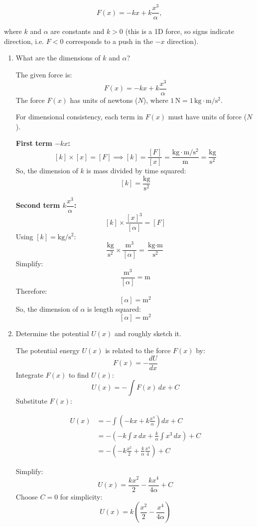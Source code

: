 \documentclass[12pt]{article}
\begin{document}
\[
F(x) = -kx + k \frac{x^3}{\alpha} ,
\]

where \(k\) and \(\alpha\) are constants and \(k > 0\) (this is a 1D force, so signs indicate direction, i.e. \(F < 0\) corresponds to a push in the \(-x\) direction).

\begin{enumerate}

\item What are the dimensions of \(k\) and \(\alpha\)?

The given force is:
\[
F(x) = -kx + k \frac{x^3}{\alpha}
\]
The force \(F(x)\) has units of newtons (\(N\)), where \(1\,\text{N} = 1\,\text{kg} \cdot \text{m}/\text{s}^2\).

For dimensional consistency, each term in \(F(x)\) must have units of force (\(N\)).

\textbf{First term \(-kx\):}
\[
[k] \times [x] = [F] \implies [k] = \frac{[F]}{[x]} = \frac{\text{kg} \cdot \text{m}/\text{s}^2}{\text{m}} = \frac{\text{kg}}{\text{s}^2}
\]
So, the dimension of \(k\) is mass divided by time squared:
\[
[k] = \frac{\text{kg}}{\text{s}^2}
\]

\textbf{Second term \(k \dfrac{x^3}{\alpha}\):}
\[
[k] \times \frac{[x]^3}{[\alpha]} = [F]
\]
Using \([k] = \text{kg}/\text{s}^2\):
\[
\frac{\text{kg}}{\text{s}^2} \times \frac{\text{m}^3}{[\alpha]} = \frac{\text{kg} \cdot \text{m}}{\text{s}^2}
\]
Simplify:
\[
\frac{\text{m}^3}{[\alpha]} = \text{m}
\]
Therefore:
\[
[\alpha] = \text{m}^2
\]
So, the dimension of \(\alpha\) is length squared:
\[
[\alpha] = \text{m}^2
\]

\item Determine the potential \(U(x)\) and roughly sketch it.

The potential energy \(U(x)\) is related to the force \(F(x)\) by:
\[
F(x) = -\frac{dU}{dx}
\]
Integrate \(F(x)\) to find \(U(x)\):
\[
U(x) = -\int F(x) \, dx + C
\]
Substitute \(F(x)\):

\begin{align*}
U(x) &= -\int \left( -kx + k \frac{x^3}{\alpha} \right) dx + C \\
&= -\left( -k \int x \, dx + \frac{k}{\alpha} \int x^3 \, dx \right) + C \\
&= -\left( -k \frac{x^2}{2} + \frac{k}{\alpha} \frac{x^4}{4} \right) + C
\end{align*}

Simplify:
\[
U(x) = \frac{k x^2}{2} - \frac{k x^4}{4\alpha} + C
\]
Choose \(C = 0\) for simplicity:
\[
U(x) = k \left( \frac{x^2}{2} - \frac{x^4}{4\alpha} \right)
\]


\end{enumerate}
\end{document}

